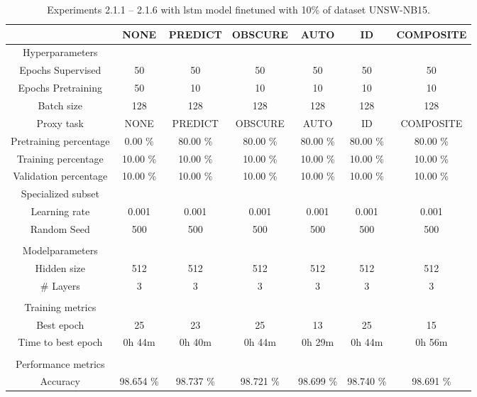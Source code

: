 \begin{table}[htb]
    \centering
    \caption{Experiments 2.1.1 – 2.1.6 with \gls{lstm} model finetuned with 10\% of dataset UNSW-NB15.}
    \label{table:results:lstm:flows15_10}
    \begin{tabular}{@{}ccccccc@{}}
        \toprule
         &  NONE &  PREDICT &  OBSCURE &  AUTO &  ID &  COMPOSITE \\
        \midrule
        Hyperparameters &  &  &  &  &  &  \\
        Epochs Supervised &  50 &  50 &  50 &  50 &  50 &  50 \\
        Epochs Pretraining &  50 &  10 &  10 &  10 &  10 &  10 \\
        Batch size &  128 &  128 &  128 &  128 &  128 &  128 \\
        Proxy task &  NONE &  PREDICT &  OBSCURE &  AUTO &  ID &  COMPOSITE \\
        Pretraining percentage &  0.00 \% &  80.00 \% &  80.00 \% &  80.00 \% &  80.00 \% &  80.00 \% \\
        Training percentage &  10.00 \% &  10.00 \% &  10.00 \% &  10.00 \% &  10.00 \% &  10.00 \% \\
        Validation percentage &  10.00 \% &  10.00 \% &  10.00 \% &  10.00 \% &  10.00 \% &  10.00 \% \\
        Specialized subset &   &   &   &   &   &   \\
        Learning rate &  0.001 &  0.001 &  0.001 &  0.001 &  0.001 &  0.001 \\
        Random Seed &  500 &  500 &  500 &  500 &  500 &  500 \\
         \\
        Modelparameters &  &  &  &  &  &  \\
        Hidden size &  512 &  512 &  512 &  512 &  512 &  512 \\
        \# Layers &  3 &  3 &  3 &  3 &  3 &  3 \\
         \\
        Training metrics &  &  &  &  &  &  \\
        Best epoch &  25 &  23 &  25 &  13 &  25 &  15 \\
        Time to best epoch &  0h 44m &  0h 40m &  0h 44m &  0h 29m &  0h 44m &  0h 56m \\
         \\
        Performance metrics &  &  &  &  &  &  \\
        Accuracy &  98.654 \% &  98.737 \% &  98.721 \% &  98.699 \% &  98.740 \% &  98.691 \% \\

\end{tabular}
\end{table}
